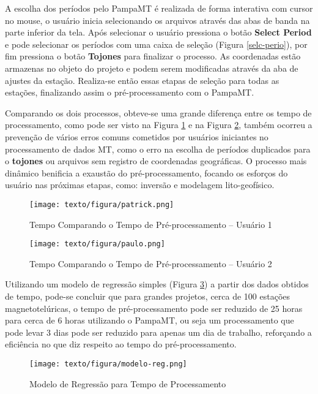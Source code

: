     A escolha dos períodos pelo PampaMT é realizada de forma interativa com cursor no mouse, o usuário inicia selecionando os arquivos  através das abas de banda na parte inferior da tela. Após selecionar o usuário pressiona o botão \textbf{Select Period} e pode selecionar os períodos com uma caixa de seleção (Figura \ref{selc-perio}), por fim pressiona o botão \textbf{Tojones} para finalizar o processo. As coordenadas estão armazenas no objeto do projeto e podem serem modificadas através da aba de ajustes da estação. Realiza-se então essas etapas de seleção para todas as estações, finalizando assim o pré-processamento com o PampaMT.
    
    Comparando os dois processos, obteve-se uma grande diferença entre os tempo de processamento, como pode ser visto na Figura \ref{tempo-pa} e na Figura \ref{tempo-pau}, também ocorreu a prevenção de vários erros comuns cometidos por usuários iniciantes no processamento de dados MT, como o erro na escolha de períodos duplicados para o \textbf{tojones} ou arquivos sem registro de coordenadas geográficas. O processo mais dinâmico benificia a exaustão do pré-processamento, focando os esforços do usuário nas próximas etapas, como: inversão e modelagem lito-geofísico. 
        
    
    \begin{figure}[H]
        \caption{Tempo Comparando o Tempo de Pré-processamento -- Usuário 1}
            \begin{center}
                \texttt{[image: texto/figura/patrick.png]}
            \end{center}
        \legend{\Fonte{\oautor}}
        \label{tempo-pa}
    \end{figure}
    
    \begin{figure}[H]
        \caption{Tempo Comparando o Tempo de Pré-processamento -- Usuário 2}
            \begin{center}
                \texttt{[image: texto/figura/paulo.png]}
            \end{center}
        \legend{\Fonte{\oautor}}
        \label{tempo-pau}
    \end{figure}
    
    
    Utilizando um modelo de regressão simples (Figura \ref{modelo-reg}) a partir dos dados obtidos de tempo, pode-se concluir que para grandes projetos, cerca de 100 estações magnetotelúricas, o tempo de pré-processamento pode ser reduzido de 25 horas para cerca de 6 horas utilizando o PampaMT, ou seja um processamento que pode levar 3 dias pode ser reduzido para apenas um dia de trabalho, reforçando a eficiência no que diz respeito ao tempo do pré-processamento.   
    
    \begin{figure}[H]
        \caption{Modelo de Regressão para Tempo de Processamento}
            \begin{center}
                \texttt{[image: texto/figura/modelo-reg.png]}
            \end{center}
        \legend{\Fonte{\oautor}}
        \label{modelo-reg}
    \end{figure}      
        
